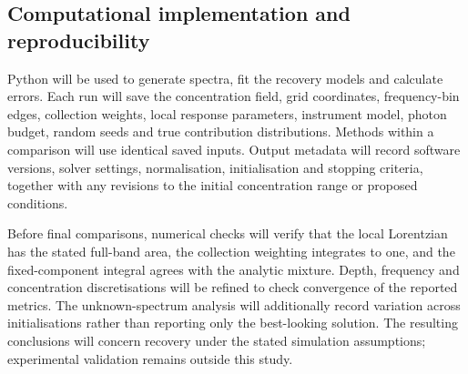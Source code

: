 \documentclass[11pt]{article}
\begin{document}
\subsection{Computational implementation and reproducibility}

Python will be used to generate spectra, fit the recovery models and calculate errors. Each run will save the concentration field, grid coordinates, frequency-bin edges, collection weights, local response parameters, instrument model, photon budget, random seeds and true contribution distributions. Methods within a comparison will use identical saved inputs. Output metadata will record software versions, solver settings, normalisation, initialisation and stopping criteria, together with any revisions to the initial concentration range or proposed conditions.

Before final comparisons, numerical checks will verify that the local Lorentzian has the stated full-band area, the collection weighting integrates to one, and the fixed-component integral agrees with the analytic mixture. Depth, frequency and concentration discretisations will be refined to check convergence of the reported metrics. The unknown-spectrum analysis will additionally record variation across initialisations rather than reporting only the best-looking solution. The resulting conclusions will concern recovery under the stated simulation assumptions; experimental validation remains outside this study.

\clearpage
\end{document}

